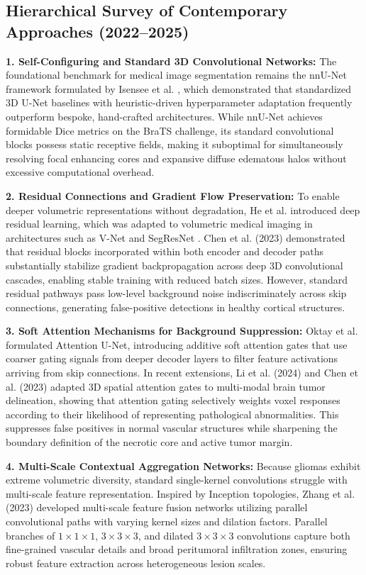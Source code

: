 \documentclass[conference]{IEEEtran}
\begin{document}
\subsection{Hierarchical Survey of Contemporary Approaches (2022--2025)}
\textbf{1. Self-Configuring and Standard 3D Convolutional Networks:} The foundational benchmark for medical image segmentation remains the nnU-Net framework formulated by Isensee et al. \cite{isensee2021nnu}, which demonstrated that standardized 3D U-Net baselines with heuristic-driven hyperparameter adaptation frequently outperform bespoke, hand-crafted architectures. While nnU-Net achieves formidable Dice metrics on the BraTS challenge, its standard convolutional blocks possess static receptive fields, making it suboptimal for simultaneously resolving focal enhancing cores and expansive diffuse edematous halos without excessive computational overhead.

\textbf{2. Residual Connections and Gradient Flow Preservation:} To enable deeper volumetric representations without degradation, He et al. \cite{he2016deep} introduced deep residual learning, which was adapted to volumetric medical imaging in architectures such as V-Net \cite{milletari2016v} and SegResNet \cite{myronenko20193d}. Chen et al. \cite{chen2023attention} (2023) demonstrated that residual blocks incorporated within both encoder and decoder paths substantially stabilize gradient backpropagation across deep 3D convolutional cascades, enabling stable training with reduced batch sizes. However, standard residual pathways pass low-level background noise indiscriminately across skip connections, generating false-positive detections in healthy cortical structures.

\textbf{3. Soft Attention Mechanisms for Background Suppression:} Oktay et al. \cite{oktay2018attention} formulated Attention U-Net, introducing additive soft attention gates that use coarser gating signals from deeper decoder layers to filter feature activations arriving from skip connections. In recent extensions, Li et al. \cite{li2024deep} (2024) and Chen et al. \cite{chen2023attention} (2023) adapted 3D spatial attention gates to multi-modal brain tumor delineation, showing that attention gating selectively weights voxel responses according to their likelihood of representing pathological abnormalities. This suppresses false positives in normal vascular structures while sharpening the boundary definition of the necrotic core and active tumor margin.

\textbf{4. Multi-Scale Contextual Aggregation Networks:} Because gliomas exhibit extreme volumetric diversity, standard single-kernel convolutions struggle with multi-scale feature representation. Inspired by Inception topologies, Zhang et al. \cite{zhang2023multi} (2023) developed multi-scale feature fusion networks utilizing parallel convolutional paths with varying kernel sizes and dilation factors. Parallel branches of $1\times 1\times 1$, $3\times 3\times 3$, and dilated $3\times 3\times 3$ convolutions capture both fine-grained vascular details and broad peritumoral infiltration zones, ensuring robust feature extraction across heterogeneous lesion scales.
\end{document}
